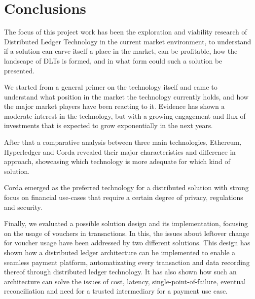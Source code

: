 \chapter{Conclusions}
\label{chap:conclusions}

The focus of this project work has been the exploration and viability research of Distributed Ledger Technology in the current market environment, to understand if a solution can carve itself a place in the market, can be profitable, how the landscape of DLTs is formed, and in what form could such a solution be presented. 

We started from a general primer on the technology itself and came to understand what position in the market the technology currently holds, and how the major market players have been reacting to it. 
Evidence has shown a moderate interest in the technology, but with a growing engagement and flux of investments that is expected to grow exponentially in the next years.

After that a comparative analysis between three main technologies, Ethereum, Hyperledger and Corda revealed their major characteristics and difference in approach, showcasing which technology is more adequate for which kind of solution. 

Corda emerged as the preferred technology for a distributed solution with strong focus on financial use-cases that require a certain degree of privacy, regulations and security.

Finally, we evaluated a possible solution design and its implementation, focusing on the usage of vouchers in transactions. 
In this, the issues about leftover change for voucher usage have been addressed by two different solutions.
This design has shown how a distributed ledger architecture can be implemented to enable a seamless payment platform, automatizating every transaction and data recording thereof through distributed ledger technology. It has also shown how such an architecture can solve the issues of cost, latency, single-point-of-failure, eventual reconciliation and need for a trusted intermediary for a payment use case.